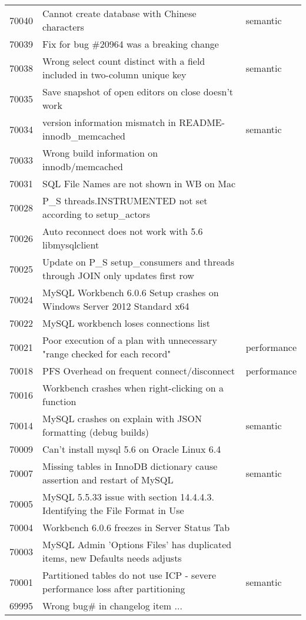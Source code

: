 \begin{longtable}[c]{p{1cm}p{10cm}p{1cm}}
70040 & Cannot create database with Chinese characters & semantic \\
70039 & Fix for bug \#20964 was a breaking change &  \\
70038 & Wrong select count distinct with a field included in two-column unique key & semantic \\
70035 & Save snapshot of open editors on close doesn't work &  \\
70034 & version information mismatch in README-innodb\_memcached & semantic \\
70033 & Wrong build information on innodb/memcached &  \\
70031 & SQL File Names are not shown in WB on Mac &  \\
70028 & P\_S threads.INSTRUMENTED not set according to setup\_actors &  \\
70026 & Auto reconnect does not work with 5.6 libmysqlclient &  \\
70025 & Update on P\_S setup\_consumers and threads through JOIN only updates first row &  \\
70024 & MySQL Workbench 6.0.6 Setup crashes on Windows Server 2012 Standard x64 &  \\
70022 & MySQL workbench loses connections list &  \\
70021 & Poor execution of a plan with unnecessary "range checked for each record" & performance \\
70018 & PFS Overhead on frequent connect/disconnect & performance \\
70016 & Workbench crashes when right-clicking on a function &  \\
70014 & MySQL crashes on explain with JSON formatting (debug builds) & semantic \\
70009 & Can't install mysql 5.6 on Oracle Linux 6.4 &  \\
70007 & Missing tables in InnoDB dictionary cause assertion and restart of MySQL & semantic \\
70005 & MySQL 5.5.33 issue with section 14.4.4.3. Identifying the File Format in Use &  \\
70004 & Workbench 6.0.6 freezes in Server Status Tab &  \\
70003 & MySQL Admin 'Options Files' has duplicated items, new Defaults needs adjusts &  \\
70001 & Partitioned tables do not use ICP - severe performance loss after partitioning & semantic \\
69995 & Wrong bug\# in changelog item ... &  \\

\end{longtable}
